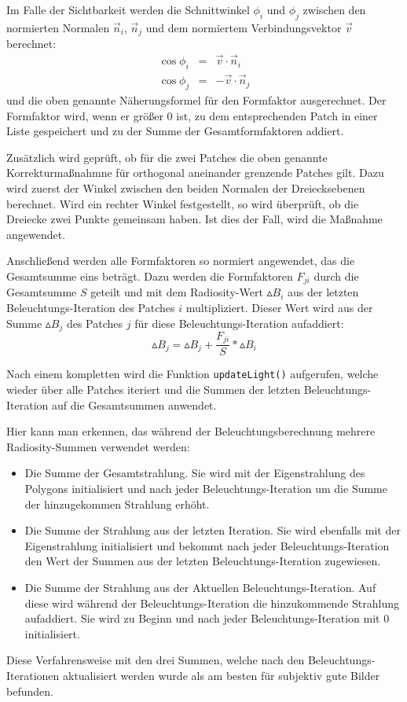 \documentclass[final,a4paper,11pt,notitlepage,halfparskip]{scrreprt}
\begin{document}
Im Falle der Sichtbarkeit werden die Schnittwinkel $\phi_i$ und $\phi_j$ 
zwischen den normierten Normalen $\vec{n}_i$, $\vec{n}_j$ und dem normiertem
Verbindungsvektor $\vec{v}$ berechnet:
\begin{eqnarray*}
  \cos\phi_i &=& \vec{v} \cdot \vec{n}_i\\
  \cos\phi_j &=& -\vec{v} \cdot \vec{n}_j
\end{eqnarray*}
und die oben genannte Näherungsformel für den Formfaktor ausgerechnet.
Der Formfaktor wird, wenn er größer $0$ ist, zu dem entsprechenden Patch in 
einer Liste gespeichert und zu der Summe der Gesamtformfaktoren addiert.

Zusätzlich wird geprüft, ob für die zwei Patches die oben genannte 
Korrekturmaßnahmne für orthogonal aneinander grenzende Patches gilt. Dazu wird 
zuerst der Winkel zwischen den beiden Normalen der Dreiecksebenen berechnet. 
Wird ein rechter Winkel festgestellt, so wird überprüft, ob die Dreiecke zwei 
Punkte gemeinsam haben. Ist dies der Fall, wird die Maßnahme angewendet.

Anschließend werden alle Formfaktoren so normiert angewendet, das die
Gesamtsumme eins beträgt. Dazu werden die Formfaktoren $F_{ji}$ durch die
Gesamtsumme $S$ geteilt und mit dem Radiosity-Wert $\vartriangle B_i$ aus der
letzten Beleuchtungs-Iteration des Patches $i$ multipliziert. Dieser Wert wird aus der
Summe $\vartriangle B_j$ des Patches $j$ für diese Beleuchtungs-Iteration aufaddiert:
$$\vartriangle{B_j} = \vartriangle{B_j} + \frac{F_{ji}}{S} * \vartriangle B_i$$

Nach einem kompletten wird die Funktion \texttt{updateLight()}
aufgerufen, welche wieder über alle Patches iteriert und die Summen der letzten
Beleuchtungs-Iteration auf die Gesamtsummen anwendet.

Hier kann man erkennen, das während der Beleuchtungsberechnung mehrere
Radiosity-Summen verwendet werden:
\begin{itemize}
  \item Die Summe der Gesamtstrahlung. Sie wird mit der Eigenstrahlung des
    Polygons initialisiert und nach jeder Beleuchtungs-Iteration um die Summe der
    hinzugekommen Strahlung erhöht.
  \item Die Summe der Strahlung aus der letzten Iteration. Sie wird ebenfalls
    mit der Eigenstrahlung initialisiert und bekommt nach jeder Beleuchtungs-Iteration den
    Wert der Summen aus der letzten Beleuchtungs-Iteration zugewiesen.
  \item Die Summe der Strahlung aus der Aktuellen Beleuchtungs-Iteration. Auf diese wird
    während der Beleuchtungs-Iteration die hinzukommende Strahlung aufaddiert. Sie wird zu
    Beginn und nach jeder Beleuchtungs-Iteration mit $0$ initialisiert.
\end{itemize}
Diese Verfahrensweise mit den drei Summen, welche nach den Beleuchtungs-Iterationen
aktualisiert werden wurde als am besten für subjektiv gute Bilder befunden.
\end{document}
